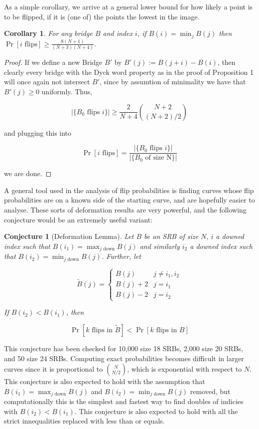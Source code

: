 \documentclass{article}
\newtheorem{corollary}{Corollary}
\newtheorem{conjecture}{Conjecture}
\theoremstyle{definition}
\begin{document}
As a simple corollary, we arrive at a general lower bound for how likely a point is to be flipped, if it is (one of) the points the lowest in the image.

\begin{corollary} For any bridge $B$ and index $i$, if $B(i)=\min_jB(j)$ then $\Pr[i \mathrm{\,\, flips}]\geq \frac{8(N+1)}{(N+3)(N+4)}$.
\end{corollary}
\begin{proof} If we define a new Bridge $B'$ by $B'(j):=B(j+i)-B(i)$, then clearly every bridge with the Dyck word property as in the proof of Proposition 1 will once again not intersect $B'$, since by assumtion of minimality we have that $B'(j)\geq0$ uniformly. Thus,

$$|\{B_0 \,\, \mathrm{flips\,\, }i\}|\geq \frac{2}{N+4}{N+2\choose (N+2)/2}$$

and plugging this into

$$\Pr[i\,\,\mathrm{flips}]=\frac{|\{B_0 \,\, \mathrm{flips\,\, }i\}|}{|\{B_0\,\,\mathrm{of\,\,size\,\,N}\}|}$$

we are done.
\end{proof}

A general tool used in the analysis of flip probabilities is finding curves whose flip probabilities are on a known side of the starting curve, and are hopefully easier to analyse. These sorts of deformation results are very powerful, and the following conjecture would be an extremely useful variant:

\begin{conjecture}[Deformation Lemma] Let $B$ be an SRB of size $N$, $i$ a downed index such that $B(i_1)=\max_{j\,\,\mathrm{down}}B(j)$ and similarly $i_2$ a downed index such that $B(i_2)=\min_{j\,\,\mathrm{down}}B(j)$. Further, let

$$\tilde{B}(j)=
\begin{cases}
B(j)& j\neq i_1,i_2\\
B(j)+2 & j=i_1\\
B(j)-2 & j=i_2
\end{cases}$$

If $B(i_2)< B(i_1)$, then

$$\Pr[k\mathrm{\,\,flips\,\,in\,\, }\tilde{B}]< \Pr[k\mathrm{\,\,flips\,\,in\,\, }B]$$
\end{conjecture}

This conjecture has been checked for 10,000 size 18 SRBs, 2,000 size 20 SRBs, and 50 size 24 SRBs. Computing exact probabilities becomes difficult in larger curves since it is proportional to ${N \choose N/2}$, which is exponential with respect to $N$. This conjecture is also expected to hold with the assumption that $B(i_1)=\max_{j\,\,\mathrm{down}}B(j)$ and $B(i_2)=\min_{j\,\,\mathrm{down}}B(j)$ removed, but computationally this is the simplest and fastest way to find doubles of indicies with $B(i_2)<B(i_1)$. This conjecture is also expected to hold with all the strict innequalities replaced with less than or equals.
\end{document}
